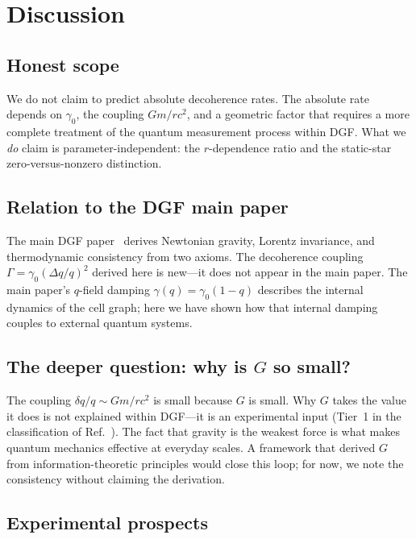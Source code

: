 \documentclass[aps,prl,twocolumn,showpacs,superscriptaddress,preprintnumbers]{revtex4-2}
\begin{document}
\section{Discussion}

\subsection{Honest scope}

We do not claim to predict absolute decoherence rates.
The absolute rate depends on $\gamma_0$, the coupling $Gm/rc^2$, and a geometric factor that requires a more complete treatment of the quantum measurement process within DGF.
What we \emph{do} claim is parameter-independent: the $r$-dependence ratio and the static-star zero-versus-nonzero distinction.

\subsection{Relation to the DGF main paper}

The main DGF paper~\cite{Huang:2026prd} derives Newtonian gravity, Lorentz invariance, and thermodynamic consistency from two axioms.
The decoherence coupling $\Gamma=\gamma_0(\Delta q/q)^2$ derived here is new---it does not appear in the main paper.
The main paper's $q$-field damping $\gamma(q)=\gamma_0(1-q)$ describes the internal dynamics of the cell graph; here we have shown how that internal damping couples to external quantum systems.

\subsection{The deeper question: why is $G$ so small?}

The coupling $\delta q/q \sim Gm/rc^2$ is small because $G$ is small.
Why $G$ takes the value it does is not explained within DGF---it is an experimental input (Tier~1 in the classification of Ref.~\cite{Huang:2026prd}).
The fact that gravity is the weakest force is what makes quantum mechanics effective at everyday scales.
A framework that derived $G$ from information-theoretic principles would close this loop; for now, we note the consistency without claiming the derivation.

\subsection{Experimental prospects}
\end{document}
